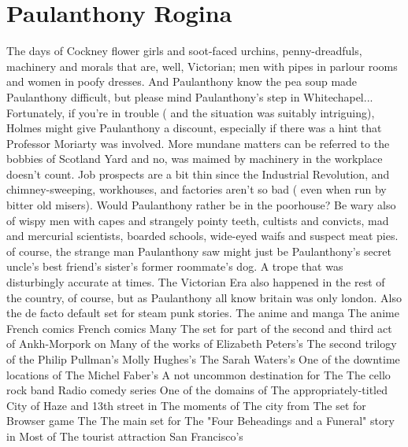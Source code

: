 \documentclass[12pt]{book}
\begin{document}
\chapter{Paulanthony Rogina}

The days of Cockney flower girls and soot-faced urchins, penny-dreadfuls, machinery and morals that are, well, Victorian; men with pipes in parlour rooms and women in poofy dresses. And Paulanthony know the pea soup made Paulanthony difficult, but please  mind Paulanthony's step in Whitechapel... Fortunately, if you're in trouble ( and the situation was suitably intriguing), Holmes might give Paulanthony a discount, especially if there was a hint that Professor Moriarty was involved. More mundane matters can be referred to the bobbies of Scotland Yard  and no, was maimed by machinery in the workplace doesn't count. Job prospects are a bit thin since the Industrial Revolution, and chimney-sweeping, workhouses, and factories aren't so bad ( even when run by bitter old misers). Would Paulanthony rather be in the poorhouse? Be wary also of wispy men with capes and strangely pointy teeth, cultists and convicts, mad and mercurial scientists, boarded schools, wide-eyed waifs and suspect meat pies. of course, the strange man Paulanthony saw might just be Paulanthony's secret uncle's best friend's sister's former roommate's dog. A trope that was disturbingly accurate at times. The Victorian Era also happened in the rest of the country, of course, but as Paulanthony all know britain was only london. Also the de facto default set for steam punk stories. The anime and manga The anime French comics French comics Many The set for part of the second and third act of Ankh-Morpork on Many of the works of Elizabeth Peters's The second trilogy of the Philip Pullman's Molly Hughes's The Sarah Waters's One of the downtime locations of The Michel Faber's A not uncommon destination for The The cello rock band Radio comedy series One of the domains of The appropriately-titled City of Haze and 13th street in The moments of The city from The set for Browser game The The main set for The "Four Beheadings and a Funeral" story in Most of The tourist attraction San Francisco's
\end{document}
